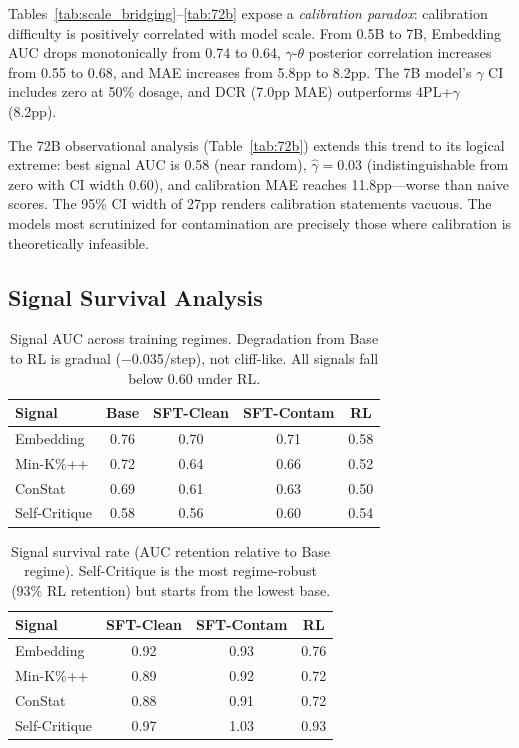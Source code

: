 \documentclass[letterpaper,11pt]{article}
\begin{document}
Tables~\ref{tab:scale_bridging}--\ref{tab:72b} expose a \emph{calibration paradox}: calibration difficulty is positively correlated with model scale.
From 0.5B to 7B, Embedding AUC drops monotonically from 0.74 to 0.64, $\gamma$-$\theta$ posterior correlation increases from 0.55 to 0.68, and MAE increases from 5.8pp to 8.2pp.
The 7B model's $\gamma$ CI includes zero at 50\% dosage, and DCR (7.0pp MAE) outperforms 4PL+$\gamma$ (8.2pp).

The 72B observational analysis (Table~\ref{tab:72b}) extends this trend to its logical extreme: best signal AUC is 0.58 (near random), $\hat{\gamma} = 0.03$ (indistinguishable from zero with CI width 0.60), and calibration MAE reaches 11.8pp---worse than naive scores.
The 95\% CI width of 27pp renders calibration statements vacuous.
The models most scrutinized for contamination are precisely those where calibration is theoretically infeasible.

\subsection{Signal Survival Analysis}
\label{sec:signal_survival}

\begin{table}[t]
\centering
\caption{Signal AUC across training regimes. Degradation from Base to RL is gradual ($-$0.035/step), not cliff-like. All signals fall below 0.60 under RL.}
\label{tab:signal_survival}
\begin{tabular}{@{}lcccc@{}}
\toprule
Signal & Base & SFT-Clean & SFT-Contam & RL \\
\midrule
Embedding & 0.76 & 0.70 & 0.71 & 0.58 \\
Min-K\%++ & 0.72 & 0.64 & 0.66 & 0.52 \\
ConStat & 0.69 & 0.61 & 0.63 & 0.50 \\
Self-Critique & 0.58 & 0.56 & 0.60 & 0.54 \\
\bottomrule
\end{tabular}
\end{table}

\begin{table}[t]
\centering
\caption{Signal survival rate (AUC retention relative to Base regime). Self-Critique is the most regime-robust (93\% RL retention) but starts from the lowest base.}
\label{tab:survival_rate}
\begin{tabular}{@{}lccc@{}}
\toprule
Signal & SFT-Clean & SFT-Contam & RL \\
\midrule
Embedding & 0.92 & 0.93 & 0.76 \\
Min-K\%++ & 0.89 & 0.92 & 0.72 \\
ConStat & 0.88 & 0.91 & 0.72 \\
Self-Critique & 0.97 & 1.03 & 0.93 \\
\bottomrule
\end{tabular}
\end{table}
\end{document}
